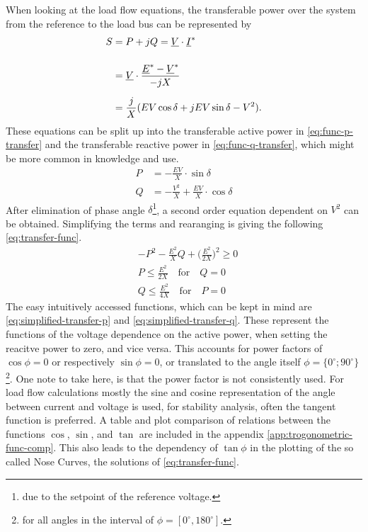When looking at the load flow equations, the transferable power over the system from the reference to the load bus can be represented by
\begin{align}
    S&=P + jQ = \underline{V} \cdot \underline{I}^* \notag \\[12pt]
    &=\underline{V} \cdot \frac{\underline{E}^* - \underline{V}^*}{-jX} \notag \\[6pt]
    &=\frac{j}{X} (EV \cos \delta + jEV \sin \delta -V^2). \notag
\end{align}
These equations can be split up into the transferable active power in \autoref{eq:func-p-transfer} and the transferable reactive power in \autoref{eq:func-q-transfer}, which might be more common in knowledge and use.
\begin{align}
    P&=-\frac{EV}{X} \cdot \sin \delta \label{eq:func-p-transfer} \\[6pt]
    Q&=-\frac{V^2}{X} + \frac{EV}{X} \cdot \cos \delta \label{eq:func-q-transfer}
\end{align}
After elimination of phase angle $\delta$\footnote{due to the setpoint of the reference voltage.}, a second order equation dependent on $V^2$ can be obtained.
Simplifying the terms and rearanging is giving the following \autoref{eq:transfer-func}.
\begin{align}
    &-P^2 - \frac{E^2}{X}Q + \bigg(\frac{E^2}{2X}\bigg)^2 \geq 0 \label{eq:transfer-func} \\[12pt]
    &P \leq \frac{E^2}{2X} \quad\text{for}\quad Q=0 \label{eq:simplified-transfer-p} \\[6pt]
    &Q \leq \frac{E^2}{4X} \quad\text{for}\quad P=0 \label{eq:simplified-transfer-q}
\end{align}
The easy intuitively accessed functions, which can be kept in mind are \autoref{eq:simplified-transfer-p} and \autoref{eq:simplified-transfer-q}.
These represent the functions of the voltage dependence on the active power, when setting the reacitve power to zero, and vice versa. 
This accounts for power factors of $\cos \phi = 0$ or respectively $\sin \phi = 0$, or translated to the angle itself $\phi = \{0^\circ; 90^\circ\}$\footnote{for all angles in the interval of $\phi = [0^\circ, 180^\circ]$.}.
One note to take here, is that the power factor is not consistently used.
For load flow calculations mostly the sine and cosine representation of the angle between current and voltage is used, for stability analysis, often the tangent function is preferred.
A table and plot comparison of relations between the functions $\cos$, $\sin$, and $\tan$ are included in the appendix \autoref{app:trogonometric-func-comp}. 
This also leads to the dependency of $\tan \phi$ in the plotting of the so called Nose Curves, the solutions of \autoref{eq:transfer-func}.

